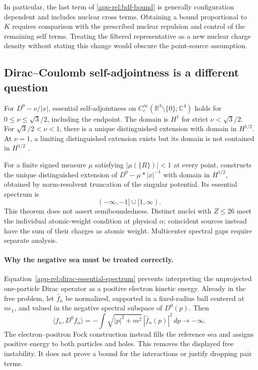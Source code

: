 In particular, the last term of \eqref{app-rel:bdf-bound} is generally
configuration dependent and includes nuclear cross terms. Obtaining a
bound proportional to $K$ requires comparison with the prescribed nuclear
repulsion and control of the remaining self terms. Treating the filtered
representative as a new nuclear charge density without stating this change
would obscure the point-source assumption.

\subsection{Dirac--Coulomb self-adjointness is a different question}
\label{app-rel:dirac-coulomb}

For $D^0-\nu/|x|$, essential self-adjointness on
$C_c^\infty(\mathbb R^3\setminus\{0\};\mathbb C^4)$ holds for
$0\le\nu\le\sqrt3/2$, including the endpoint. The domain is $H^1$ for
strict $\nu<\sqrt3/2$. For $\sqrt3/2<\nu<1$, there is a unique
distinguished extension with domain in $H^{1/2}$. At $\nu=1$, a limiting
distinguished extension exists but its domain is not contained in
$H^{1/2}$ \cite[Section~2]{ELS2021}.

For a finite signed measure $\mu$ satisfying
$|\mu(\{R\})|<1$ at every point, \cite[Theorem~1]{ELS2021} constructs the
unique distinguished extension of $D^0-\mu*|x|^{-1}$ with domain in
$H^{1/2}$, obtained by norm-resolvent truncation of the singular potential.
Its essential spectrum is
\begin{equation}
 (-\infty,-1]\cup[1,\infty).
 \label{app-rel:dirac-essential-spectrum}
\end{equation}
This theorem does not assert semiboundedness. Distinct nuclei with
$Z\le26$ meet the individual atomic-weight condition at physical $\alpha$;
coincident sources instead have the sum of their charges as atomic weight.
Multicenter spectral gaps require separate analysis.

\paragraph{Why the negative sea must be treated correctly.}
Equation~\eqref{app-rel:dirac-essential-spectrum} prevents interpreting the
unprojected one-particle Dirac operator as a positive electron kinetic
energy. Already in the free problem, let $\widehat f_n$ be normalized,
supported in a fixed-radius ball centered at $ne_1$, and valued in the
negative spectral subspace of $D^0(p)$. Then
\[
 \langle f_n,D^0 f_n\rangle
 =-\int\sqrt{|p|^2+m^2}\,|\widehat f_n(p)|^2\,dp
 \longrightarrow-\infty.
\]
The electron--positron Fock construction instead fills the reference sea
and assigns positive energy to both particles and holes. This removes the
displayed free instability. It does not prove a bound for the interactions
or justify dropping pair terms.

